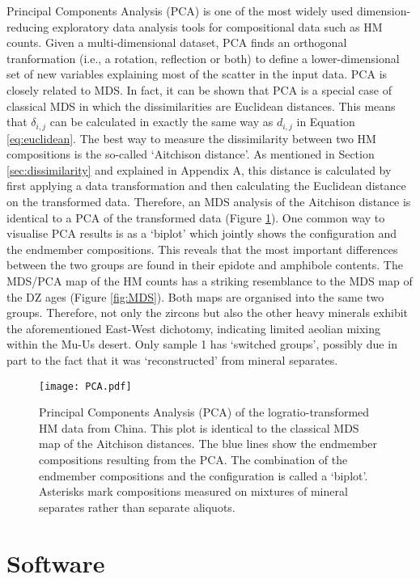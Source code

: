 \documentclass[authoryear,preprint,review,12pt]{elsarticle}
\begin{document}
Principal Components Analysis (PCA) is one of the most widely used
dimension-reducing exploratory data analysis tools for compositional
data such as HM counts.  Given a multi-dimensional dataset, PCA finds
an orthogonal tranformation (i.e., a rotation, reflection or both) to
define a lower-dimensional set of new variables explaining most of the
scatter in the input data.  PCA is closely related to MDS. In fact, it
can be shown that PCA is a special case of classical MDS in which the
dissimilarities are Euclidean distances. This means that
$\delta_{i,j}$ can be calculated in exactly the same way as $d_{i,j}$
in Equation \ref{eq:euclidean}.  The best way to measure the
dissimilarity between two HM compositions is the so-called `Aitchison
distance'. As mentioned in Section \ref{sec:dissimilarity} and
explained in Appendix A, this distance is calculated by first applying
a data transformation and then calculating the Euclidean distance on
the transformed data. Therefore, an MDS analysis of the Aitchison
distance is identical to a PCA of the transformed data (Figure
\ref{fig:PCA}).  One common way to visualise PCA results is as a
`biplot' which jointly shows the configuration and the endmember
compositions. This reveals that the most important differences between
the two groups are found in their epidote and amphibole contents.  The
MDS/PCA map of the HM counts has a striking resemblance to the MDS map
of the DZ ages (Figure \ref{fig:MDS}). Both maps are organised into
the same two groups.  Therefore, not only the zircons but also the
other heavy minerals exhibit the aforementioned East-West dichotomy,
indicating limited aeolian mixing within the Mu-Us desert.  Only
sample 1 has `switched groups', possibly due in part to the fact that
it was `reconstructed' from mineral separates.

\begin{figure}
\texttt{[image: PCA.pdf]}
\caption{Principal Components Analysis (PCA) of the
  logratio-transformed HM data from China.  This plot is identical to
  the classical MDS map of the Aitchison distances. The blue lines
  show the endmember compositions resulting from the PCA. The
  combination of the endmember compositions and the configuration is
  called a `biplot'. Asterisks mark compositions measured on mixtures
  of mineral separates rather than separate aliquots.}
\label{fig:PCA}
\end{figure}

\section{Software}
\label{sec:software}
\end{document}
